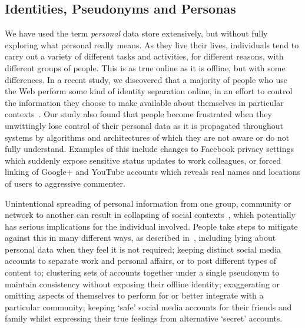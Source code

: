 \documentclass{sig-alternate}
\begin{document}
\subsection{Identities, Pseudonyms and Personas}



We have used the term \emph{personal} data store extensively, but without fully exploring what personal really means. As they live their lives, individuals tend to carry out a variety of different tasks and activities, for different reasons, with different groups of people. This is as true online as it is offline, but with some differences. In a recent study, we discovered that a majority of people who use the Web perform some kind of identity separation online, in an effort to control the information they choose to make available about themselves in particular contexts~\cite{turnip}.  Our study also found that people become frustrated when they unwittingly lose control of their personal data as it is propagated throughout systems by algorithms and architectures of which they are not aware or do not fully understand. Examples of this include changes to Facebook privacy settings which suddenly expose sensitive status updates to work colleagues, or forced linking of Google+ and YouTube accounts which reveals real names and locations of users to aggressive commenter.

Unintentional spreading of personal information from one group, community or network to another can result in collapsing of social contexts~\cite{marwick2011tweet}, which potentially has serious implications for the individual involved.  People take steps to mitigate against this in many different ways, as described in~\cite{turnip}, including lying about personal data when they feel it is not required; keeping distinct social media accounts to separate work and personal affairs, or to post different types of content to; clustering sets of accounts together under a single pseudonym to maintain consistency without exposing their offline identity; exaggerating or omitting aspects of themselves to perform for or better integrate with a particular community; keeping `safe' social media accounts for their friends and family whilst expressing their true feelings from alternative `secret' accounts. 
\end{document}
